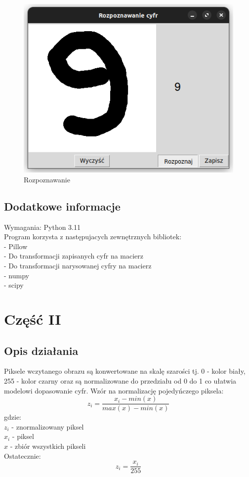 \documentclass[12pt,a4paper]{article}
\begin{document}
	\newpage
	\begin{figure}[!h]
		\includegraphics{"app2.png"}
		\centering
		\caption{Rozpoznawanie}
	\end{figure}
	\subsection*{Dodatkowe informacje}
    Wymagania:
    Python 3.11\\
    Program korzysta z następujacych zewnętrznych bibliotek:\\
    - Pillow\\
       \indent - Do transformacji zapisanych cyfr na macierz\\
       \indent - Do transformacji narysowanej cyfry na macierz\\
    - numpy\\
	- scipy
	\newpage
	\section*{Część II}
	\subsection*{Opis działania} 
    Piksele wczytanego obrazu są konwertowane na skalę szarości tj. 0 - kolor biały, 255 - kolor czarny
	oraz są normalizowane do przedziału od 0 do 1 co ułatwia modelowi dopasowanie cyfr.
	Wzór na normalizację pojedyńczego piksela:
    \[
            z_i=\frac{x_i - min(x)}{max(x) - min(x)}
    \]
	gdzie: \\
	$z_i$ - znormalizowany piksel\\
	$x_i$ - piksel\\
	$x$ - zbiór wszystkich pikseli\\
	Ostatecznie:
	\[
		z_i=\frac{x_i}{255}
	\]
\end{document}
